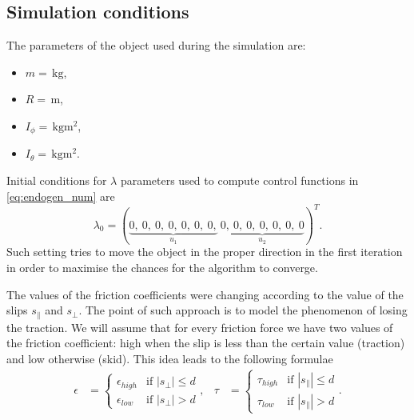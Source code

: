 \subsection{Simulation conditions}
\label{sec:discont_params_uni}
The parameters of the object used during the simulation are:
\begin{multicols}{2}
\begin{itemize}
\item $m= \,\mathrm{kg}$,
\item $R= \,\mathrm{m}$,
\item $I_\phi =\,\mathrm{kgm^2}$,
\item $I_\theta =\,\mathrm{kgm^2}$.
\end{itemize}
\end{multicols}
Initial conditions for $\lambda$ parameters used to compute control functions
in \eqref{eq:endogen_num} are
\begin{equation}
\lambda_0=
(\underbrace{0, \ 0, \ 0, \ 0, \ 0, \ 0, \ 0,}_{u_1}\ \underbrace{0, \ 0, \ 0, \ 0, \ 0, \ 0, \ 0}_{u_2})^T.
\end{equation}
Such setting tries to move the object in the proper direction in the first iteration in order to
maximise the chances for the algorithm to converge.

The values of the friction coefficients were changing according to the value of the slips $s_\parallel$
and $s_\perp$. 
The point of such approach is to model the phenomenon
of losing the traction. We will assume that for every friction force we have two
values of the friction coefficient: high when the slip is less than the certain
value (traction) and low otherwise (skid). This idea leads to the following formulae
\begin{equation*}
\begin{aligned}
\epsilon&=\begin{cases}
\epsilon_{high} &\mbox{if } |s_\perp| \leq d \\
\epsilon_{low} &\mbox{if } |s_\perp| > d
\end{cases}, &
\tau&=\begin{cases}
\tau_{high} &\mbox{if } |s_\parallel| \leq d \\
\tau_{low} &\mbox{if } |s_\parallel| > d
\end{cases}.
\end{aligned}
\end{equation*}

